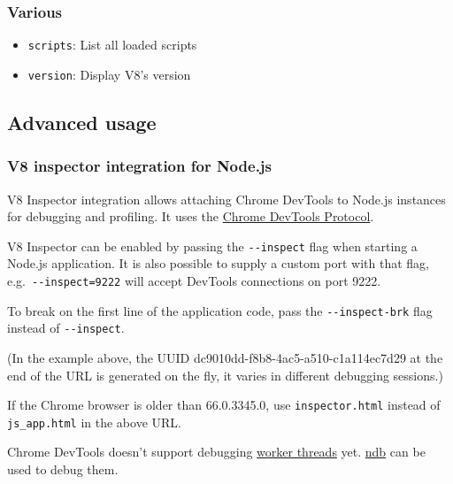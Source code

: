 \subsubsection{Various}\label{various}

\begin{itemize}
\tightlist
\item
  \texttt{scripts}: List all loaded scripts
\item
  \texttt{version}: Display V8's version
\end{itemize}

\subsection{Advanced usage}\label{advanced-usage}

\subsubsection{V8 inspector integration for
Node.js}\label{v8-inspector-integration-for-node.js}

V8 Inspector integration allows attaching Chrome DevTools to Node.js
instances for debugging and profiling. It uses the
\href{https://chromedevtools.github.io/devtools-protocol/}{Chrome
DevTools Protocol}.

V8 Inspector can be enabled by passing the \texttt{-\/-inspect} flag
when starting a Node.js application. It is also possible to supply a
custom port with that flag, e.g.~\texttt{-\/-inspect=9222} will accept
DevTools connections on port 9222.

To break on the first line of the application code, pass the
\texttt{-\/-inspect-brk} flag instead of \texttt{-\/-inspect}.

\begin{Shaded}
\begin{Highlighting}[]
\end{Highlighting}
\end{Shaded}

(In the example above, the UUID dc9010dd-f8b8-4ac5-a510-c1a114ec7d29 at
the end of the URL is generated on the fly, it varies in different
debugging sessions.)

If the Chrome browser is older than 66.0.3345.0, use
\texttt{inspector.html} instead of \texttt{js\_app.html} in the above
URL.

Chrome DevTools doesn't support debugging
\href{worker_threads.md}{worker threads} yet.
\href{https://github.com/GoogleChromeLabs/ndb/}{ndb} can be used to
debug them.
